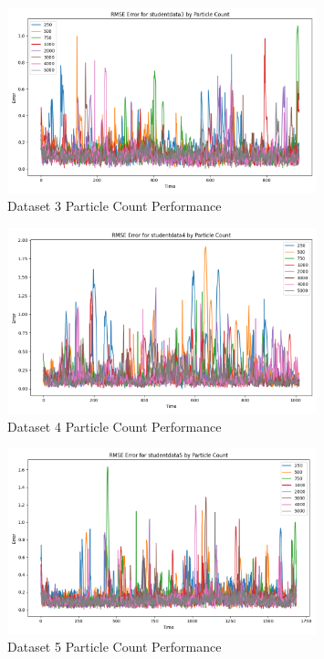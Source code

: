 \documentclass{article}
\begin{document}
\begin{figure}[H]
    \centering
    \includegraphics[width=0.8\textwidth]{./imgs/task2/studentdata3_rmse_particle_count.png}
    \caption{Dataset 3 Particle Count Performance}
\end{figure}

\begin{figure}[H]
    \centering
    \includegraphics[width=0.8\textwidth]{./imgs/task2/studentdata4_rmse_particle_count.png}
    \caption{Dataset 4 Particle Count Performance}
\end{figure}

\begin{figure}[H]
    \centering
    \includegraphics[width=0.8\textwidth]{./imgs/task2/studentdata5_rmse_particle_count.png}
    \caption{Dataset 5 Particle Count Performance}
\end{figure}
\end{document}
